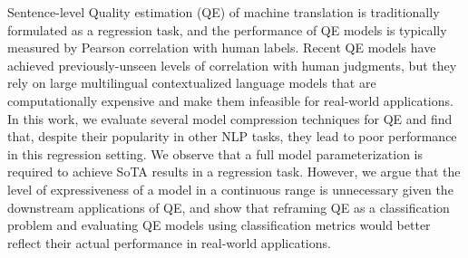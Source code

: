 Sentence-level Quality estimation (QE) of machine translation is traditionally formulated as a regression task, and the performance of QE models is typically measured by Pearson correlation with human labels. Recent QE models have achieved previously-unseen levels of correlation with human judgments, but they rely on large multilingual contextualized language models that are computationally expensive and make them infeasible for real-world applications. In this work, we evaluate several model compression techniques for QE and find that, despite their popularity in other NLP tasks, they lead to poor performance in this regression setting. We observe that a full model parameterization is required to achieve SoTA results in a regression task. However, we argue that the level of expressiveness of a model in a  continuous range is unnecessary given the downstream applications of QE, and show that reframing QE as a classification problem and evaluating QE models using classification metrics would better reflect their actual performance in real-world applications.
